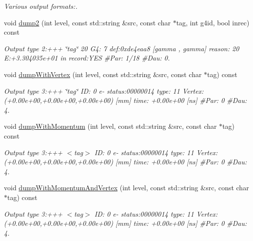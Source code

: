 \begin{DoxyCompactItemize}
\begin{DoxyCompactList}\small\item\em Various output formats:. \item\end{DoxyCompactList}\item 
void \hyperlink{class_d_d4hep_1_1_simulation_1_1_geant4_particle_handle_ae83f08e6b7a7e69e9aca2487c445aadb}{dump2} (int level, const std::string \&src, const char $\ast$tag, int g4id, bool inrec) const 
\begin{DoxyCompactList}\small\item\em Output type 2:+++ \char`\"{}tag\char`\"{} 20 G4: 7 def:0xde4eaa8 \mbox{[}gamma , gamma\mbox{]} reason: 20 E:+3.304035e+01 in record:YES \#Par: 1/18 \#Dau: 0. \item\end{DoxyCompactList}\item 
void \hyperlink{class_d_d4hep_1_1_simulation_1_1_geant4_particle_handle_ad71c2d2b9411f02726842af3cf566486}{dumpWithVertex} (int level, const std::string \&src, const char $\ast$tag) const 
\begin{DoxyCompactList}\small\item\em Output type 3:+++ \char`\"{}tag\char`\"{} ID: 0 e-\/ status:00000014 type: 11 Vertex:(+0.00e+00,+0.00e+00,+0.00e+00) \mbox{[}mm\mbox{]} time: +0.00e+00 \mbox{[}ns\mbox{]} \#Par: 0 \#Dau: 4. \item\end{DoxyCompactList}\item 
void \hyperlink{class_d_d4hep_1_1_simulation_1_1_geant4_particle_handle_a5f6c53624438fd86c2455deb22cab98a}{dumpWithMomentum} (int level, const std::string \&src, const char $\ast$tag) const 
\begin{DoxyCompactList}\small\item\em Output type 3:+++ $<$tag$>$ ID: 0 e-\/ status:00000014 type: 11 Vertex:(+0.00e+00,+0.00e+00,+0.00e+00) \mbox{[}mm\mbox{]} time: +0.00e+00 \mbox{[}ns\mbox{]} \#Par: 0 \#Dau: 4. \item\end{DoxyCompactList}\item 
void \hyperlink{class_d_d4hep_1_1_simulation_1_1_geant4_particle_handle_aa4264b3e5c3a6bf6577aa76e6a8bbb5b}{dumpWithMomentumAndVertex} (int level, const std::string \&src, const char $\ast$tag) const 
\begin{DoxyCompactList}\small\item\em Output type 3:+++ $<$tag$>$ ID: 0 e-\/ status:00000014 type: 11 Vertex:(+0.00e+00,+0.00e+00,+0.00e+00) \mbox{[}mm\mbox{]} time: +0.00e+00 \mbox{[}ns\mbox{]} \#Par: 0 \#Dau: 4. \item\end{DoxyCompactList}\item 

\end{DoxyCompactItemize}
